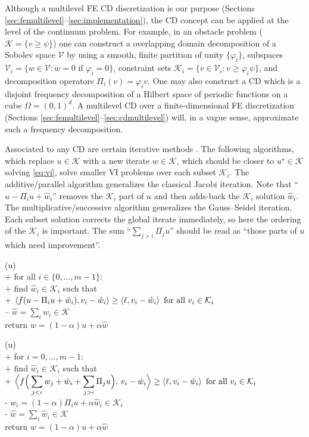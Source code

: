 \documentclass[review,hidelinks,onefignum,onetabnum]{siamart220329}
\newcommand{\cK}{\mathcal{K}}
\newcommand{\cV}{\mathcal{V}}
\newcommand{\ip}[2]{\left<#1,#2\right>}
\begin{document}
Although a multilevel FE CD discretization is our purpose (Sections \ref{sec:femultilevel}--\ref{sec:implementation}), the CD concept can be applied at the level of the continuum problem.  For example, in an obstacle problem ($\cK = \{v \ge \psi\}$) one can construct a overlapping domain decomposition of a Sobolev space $\cV$ by using a smooth, finite partition of unity $\{\varphi_i\}$, subspaces $\cV_i = \{w \in \cV : w = 0 \text{ if } \varphi_i = 0\}$, constraint sets $\cK_i = \{v \in \cV_i : v \ge \varphi_i \psi\}$, and decomposition operators $\Pi_i(v) = \varphi_i v$.  One may also construct a CD which is a disjoint frequency decomposition of a Hilbert space of periodic functions on a cube $\Omega=(0,1)^d$.  A multilevel CD over a finite-dimensional FE discretization (Sections \ref{sec:femultilevel}--\ref{sec:cdmultilevel}) will, in a vague sense, approximate such a frequency decomposition.

Associated to any CD are certain iterative methods \cite{Tai2003,Xu1992}.  The following algorithms, which replace $u \in \cK$ with a new iterate $w\in\cK$, which should be closer to $u^\star \in \cK$ solving \eqref{eq:vi}, solve smaller VI problems over each subset $\cK_i$.  The additive/parallel  algorithm generalizes the classical Jacobi iteration.  Note that ``$u-\Pi_iu+\hat w_i$'' removes the $\mathcal{K}_i$ part of $u$ and then adds-back the $\mathcal{K}_i$ solution $\hat w_i$.  The multiplicative/successive  algorithm generalizes the Gauss--Seidel iteration.  Each subset solution corrects the global iterate immediately, so here the ordering of the $\cK_i$ is important.  The sum ``$\sum_{j>i} \Pi_j u$'' should be read as ``those parts of $u$ which need improvement''.

\begin{pseudo*}
(u)\text{:} \\+
    for all $i \in \{0,\dots,m-1\}$: \\+
        \rm{find} $\hat w_i\in \cK_i$ \rm{such that} \\+
            $\ip{f(u - \Pi_i u + \hat w_i)}{v_i-\hat w_i} \ge \ip{\ell}{v_i-\hat w_i} \textnormal{ for all } v_i \in \cK_i$ \\--
    $\hat w = \sum_i \hat w_i\in\cK$ \\
    return $w=(1-\alpha) u + \alpha \hat w$
\end{pseudo*}

\begin{pseudo*}
(u)\text{:} \\+
    for $i = 0,\dots,m-1$: \\+
        \rm{find} $\hat w_i\in \cK_i$ \rm{such that} \\+
            $\displaystyle \Big<f\Big(\sum_{j<i} w_j + \hat w_i + \sum_{j>i} \Pi_j u\Big),\, v_i-\hat w_i\Big> \ge \ip{\ell}{v_i-\hat w_i} \textnormal{ for all } v_i \in \cK_i$ \\-
            $w_i = (1-\alpha) \Pi_i u + \alpha \hat w_i\in\cK_i$ \\-
    $\hat w = \sum_i \hat w_i\in\cK$ \\
    return $w=(1-\alpha) u + \alpha \hat w$
\end{pseudo*}
\end{document}

